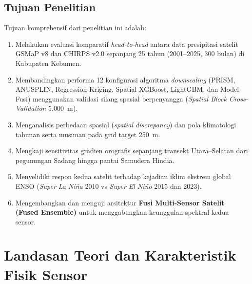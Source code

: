 \documentclass[11pt,a4paper,titlepage]{article}
\begin{document}
\subsection{Tujuan Penelitian}
Tujuan komprehensif dari penelitian ini adalah:
\begin{enumerate}
    \item Melakukan evaluasi komparatif \textit{head-to-head} antara data presipitasi satelit GSMaP v8 dan CHIRPS v2.0 sepanjang 25 tahun (2001--2025, 300 bulan) di Kabupaten Kebumen.
    \item Membandingkan performa 12 konfigurasi algoritma \textit{downscaling} (PRISM, ANUSPLIN, Regression-Kriging, Spatial XGBoost, LightGBM, dan Model Fusi) menggunakan validasi silang spasial berpenyangga (\textit{Spatial Block Cross-Validation} 5.000~m).
    \item Menganalisis perbedaan spasial (\textit{spatial discrepancy}) dan pola klimatologi tahunan serta musiman pada grid target 250~m.
    \item Mengkaji sensitivitas gradien orografis sepanjang transekt Utara--Selatan dari pegunungan Sadang hingga pantai Samudera Hindia.
    \item Menyelidiki respon kedua satelit terhadap kejadian iklim ekstrem global ENSO (\textit{Super La Ni\~na} 2010 vs \textit{Super El Ni\~no} 2015 dan 2023).
    \item Mengembangkan dan menguji arsitektur \textbf{Fusi Multi-Sensor Satelit (Fused Ensemble)} untuk menggabungkan keunggulan spektral kedua sensor.
\end{enumerate}

\section{Landasan Teori dan Karakteristik Fisik Sensor}
\end{document}
